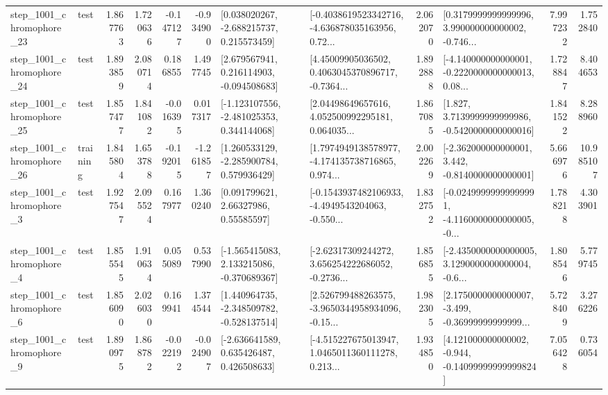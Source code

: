 \begin{tabular}{llrrrrllrlrr}
 step\_1001\_chromophore\_23 &      test &      1.867763 &    1.720636 &     -0.147127 & -0.934900 &    [0.038020267, -2.688215737, 0.215573459] &  [-0.4038619523342716, -4.636878035163956, 0.72... &       2.062070 &  [0.3179999999999996, 3.990000000000002, -0.746... &            7.997232 &          1.752840 \\
 step\_1001\_chromophore\_24 &      test &      1.893859 &    2.080714 &      0.186855 &  1.497745 &    [2.679567941, 0.216114903, -0.094508683] &  [4.45009905036502, 0.4063045370896717, -0.7364... &       1.892888 &  [-4.140000000000001, -0.2220000000000013, 0.08... &            1.728847 &          8.404653 \\
 step\_1001\_chromophore\_25 &      test &      1.857477 &    1.841082 &     -0.016395 &  0.017317 &   [-1.123107556, -2.481025353, 0.344144068] &  [2.04498649657616, 4.052500992295181, 0.064035... &       1.867085 &   [1.827, 3.7139999999999986, -0.5420000000000016] &            1.841522 &          8.288960 \\
 step\_1001\_chromophore\_26 &  training &      1.845804 &    1.653788 &     -0.192015 & -1.261857 &    [1.260533129, -2.285900784, 0.579936429] &  [1.7974949138578977, -4.174135738716865, 0.974... &       2.002269 &   [-2.362000000000001, 3.442, -0.8140000000000001] &            5.666976 &         10.985107 \\
  step\_1001\_chromophore\_3 &      test &      1.927547 &    2.095524 &      0.167977 &  1.360240 &       [0.091799621, 2.66327986, 0.55585597] &  [-0.1543937482106933, -4.4949543204063, -0.550... &       1.832752 &  [-0.02499999999999991, -4.1160000000000005, -0... &            1.788218 &          4.303901 \\
  step\_1001\_chromophore\_4 &      test &      1.855545 &    1.910634 &      0.055089 &  0.537990 &   [-1.565415083, 2.133215086, -0.370689367] &  [-2.62317309244272, 3.656254222686052, -0.2736... &       1.856855 &  [-2.4350000000000005, 3.1290000000000004, -0.6... &            1.808546 &          5.779745 \\
  step\_1001\_chromophore\_6 &      test &      1.856090 &    2.026030 &      0.169941 &  1.374544 &   [1.440964735, -2.348509782, -0.528137514] &  [2.526799488263575, -3.9650344958934096, -0.15... &       1.982305 &  [2.1750000000000007, -3.499, -0.36999999999999... &            5.728409 &          3.276226 \\
  step\_1001\_chromophore\_9 &      test &      1.890975 &    1.868782 &     -0.022192 & -0.024907 &    [-2.636641589, 0.635426487, 0.426508633] &  [-4.515227675013947, 1.0465011360111278, 0.213... &       1.934850 &  [4.121000000000002, -0.944, -0.14099999999999824] &            7.056428 &          0.736054 \\

\end{tabular}

